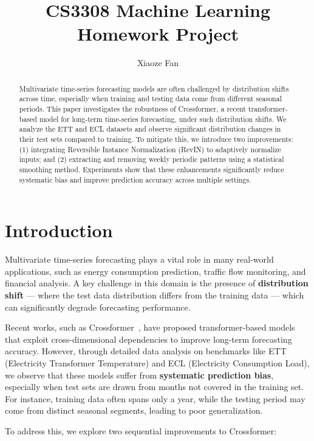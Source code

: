\documentclass{article}
\title{CS3308 Machine Learning Homework Project}
\author{
  Xiaoze Fan
}
\begin{document}
\maketitle


\begin{abstract}
Multivariate time-series forecasting models are often challenged by distribution shifts across time, especially when training and testing data come from different seasonal periods. This paper investigates the robustness of Crossformer, a recent transformer-based model for long-term time-series forecasting, under such distribution shifts. We analyze the ETT and ECL datasets and observe significant distribution changes in their test sets compared to training. To mitigate this, we introduce two improvements: (1) integrating Reversible Instance Normalization (RevIN) to adaptively normalize inputs; and (2) extracting and removing weekly periodic patterns using a statistical smoothing method. Experiments show that these enhancements significantly reduce systematic bias and improve prediction accuracy across multiple settings.
\end{abstract}



\section{Introduction}

Multivariate time-series forecasting plays a vital role in many real-world applications, such as energy consumption prediction, traffic flow monitoring, and financial analysis. A key challenge in this domain is the presence of \textbf{distribution shift} — where the test data distribution differs from the training data — which can significantly degrade forecasting performance.

Recent works, such as Crossformer~\cite{crossformer2023}, have proposed transformer-based models that exploit cross-dimensional dependencies to improve long-term forecasting accuracy. However, through detailed data analysis on benchmarks like ETT (Electricity Transformer Temperature) and ECL (Electricity Consumption Load), we observe that these models suffer from \textbf{systematic prediction bias}, especially when test sets are drawn from months not covered in the training set. For instance, training data often spans only a year, while the testing period may come from distinct seasonal segments, leading to poor generalization.

To address this, we explore two sequential improvements to Crossformer:
\end{document}
